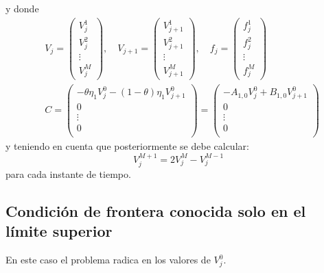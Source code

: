 y donde
\begin{align*}
    &\boxed{
        V_j = \begin{pmatrix}
            V_j^1 \\
            V_j^2 \\
            \vdots \\
            V_j^M
        \end{pmatrix}, \quad
        V_{j+1} = \begin{pmatrix}
            V_{j+1}^1 \\
            V_{j+1}^2 \\
            \vdots \\
            V_{j+1}^M
        \end{pmatrix}, \quad
        f_j = \begin{pmatrix}
            f_j^1 \\
            f_j^2 \\
            \vdots \\
            f_j^M
        \end{pmatrix}
    } \\
    &\boxed{
        C = \begin{pmatrix}
            -\theta\eta_1 V_j^{0} - (1-\theta)\eta_1 V_{j+1}^{0} \\
            0 \\
            \vdots \\
            0 \\
        \end{pmatrix}
        = \begin{pmatrix}
            -A_{1,0}V_j^{0} + B_{1,0}V_{j+1}^{0} \\
            0 \\
            \vdots \\
            0 \\
        \end{pmatrix}
    }
\end{align*}
y teniendo en cuenta que posteriormente se debe calcular:
\begin{equation*}
    \boxed{V_j^{M+1} = 2V_j^{M} - V_j^{M-1}}
\end{equation*}
para cada instante de tiempo.





\subsection{Condición de frontera conocida solo en el límite superior}\label{sec:DF_condicion_frontera_superior_conocida}
En este caso el problema radica en los valores de $V_j^0$.

